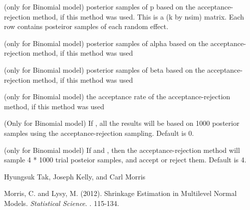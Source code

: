 \documentclass[a4paper]{book}
\begin{document}
\begin{Value}
\begin{ldescription}
\item[\code{p}] (only for Binomial model) posterior samples of p based on the acceptance-rejection method, if this method was used. This is a (k by nsim) matrix. Each row contains posteiror samples of each random effect.
\item[\code{alpha}] (only for Binomial model) posterior samples of alpha based on the acceptance-rejection method, if this method was used
\item[\code{beta}] (only for Binomial model) posterior samples of beta based on the acceptance-rejection method, if this method was used
\item[\code{accept.rate}] (only for Binomial model) the acceptance rate of the acceptance-rejection method, if this method was used
\item[\code{n.AR}] (Only for Binomial model) If , all the results will be based on 1000 posterior samples using the acceptance-rejection sampling. Default is 0.

\item[\code{n.AR.factor}] (only for Binomial model) If  and , then the acceptance-rejection method will sample 4 * 1000 trial posteior samples, and accept or reject them. Default is 4.
\end{ldescription}
\end{Value}
%
\begin{Author}\relax
Hyungsuk Tak, Joseph Kelly, and Carl Morris
\end{Author}
%
\begin{References}\relax
Morris, C. and Lysy, M. (2012). Shrinkage Estimation in Multilevel Normal Models. 
\emph{Statistical Science}. . 115-134.
\end{References}
%
\end{document}
